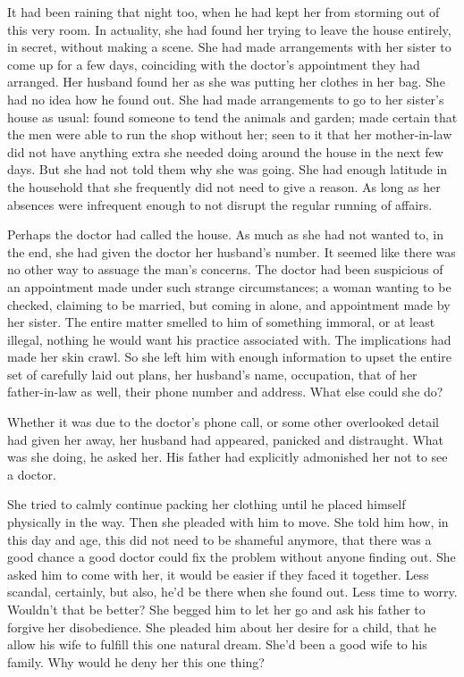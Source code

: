 \documentclass{article}
\begin{document}
It had been raining that night too, when he had kept her from storming out of this very room. In actuality, she had found her trying to leave the house entirely, in secret, without making a scene. She had made arrangements with her sister to come up for a few days, coinciding with the doctor's appointment they had arranged. Her husband found her as she was putting her clothes in her bag. She had no idea how he found out. She had made arrangements to go to her sister's house as usual: found someone to tend the animals and garden; made certain that the men were able to run the shop without her; seen to it that her mother-in-law did not have anything extra she needed doing around the house in the next few days. But she had not told them why she was going. She had enough latitude in the household that she frequently did not need to give a reason. As long as her absences were infrequent enough to not disrupt the regular running of affairs.

Perhaps the doctor had called the house. As much as she had not wanted to, in the end, she had given the doctor her husband's number. It seemed like there was no other way to assuage the man's concerns. The doctor had been suspicious of an appointment made under such strange circumstances; a woman wanting to be checked, claiming to be married, but coming in alone, and appointment made by her sister. The entire matter smelled to him of something immoral, or at least illegal, nothing he would want his practice associated with. The implications had made her skin crawl. So she left him with enough information to upset the entire set of carefully laid out plans, her husband's name, occupation, that of her father-in-law as well, their phone number and address. What else could she do?

Whether it was due to the doctor's phone call, or some other overlooked detail had given her away, her husband had appeared, panicked and distraught. What was she doing, he asked her.  His father had explicitly admonished her not to see a doctor. 

She tried to calmly continue packing her clothing until he placed himself physically in the way. Then she pleaded with him to move. She told him how, in this day and age, this did not need to be shameful anymore, that there was a good chance a good doctor could fix the problem without anyone finding out. She asked him to come with her, it would be easier if they faced it together. Less scandal, certainly, but also, he'd be there when she found out. Less time to worry. Wouldn't that be better? She begged him to let her go and ask his father to forgive her disobedience. She pleaded him about her desire for a child, that he allow his wife to fulfill this one natural dream. She'd been a good wife to his family. Why would he deny her this one thing?
\end{document}
